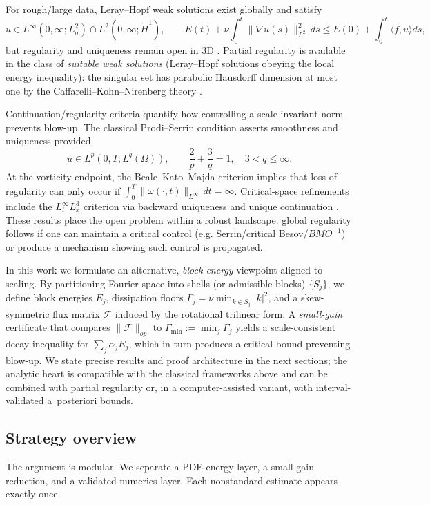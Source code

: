 \IfFileExists{nyjm.cls}{\documentclass[11pt]{nyjm}}{\documentclass[11pt]{amsart}}
\theoremstyle{plain}
\theoremstyle{definition}
\theoremstyle{remark}
\begin{document}
For rough/large data, Leray--Hopf weak solutions exist globally and satisfy
\[
u\in L^\infty(0,\infty;L^2_\sigma)\cap L^2(0,\infty;\dot H^1),\qquad
E(t)+\nu\int_0^t \|\nabla u(s)\|_{L^2}^2\,ds \le E(0) + \int_0^t\!\!\langle f,u\rangle ds,
\]
but regularity and uniqueness remain open in 3D \cite{Leray1934,Hopf1951,Ladyzhenskaya1969,Lions1969}. Partial regularity is available in the class of \emph{suitable weak solutions} (Leray--Hopf solutions obeying the local energy inequality): the singular set has parabolic Hausdorff dimension at most one by the Caffarelli--Kohn--Nirenberg theory \cite{CKN1982}.


Continuation/regularity criteria quantify how controlling a scale-invariant norm prevents blow-up. The classical Prodi--Serrin condition \cite{Prodi1959,Serrin1962} asserts smoothness and uniqueness provided
\[
u\in L^p(0,T;L^q(\Omega)),\qquad \frac{2}{p}+\frac{3}{q}=1,\quad 3<q\le\infty.
\]
At the vorticity endpoint, the Beale--Kato--Majda criterion \cite{BealeKatoMajda1984} implies that loss of regularity can only occur if $\int_0^T \|\omega(\cdot,t)\|_{L^\infty}\,dt=\infty$. Critical-space refinements include the $L^\infty_t L^3_x$ criterion via backward uniqueness and unique continuation \cite{EscauriazaSereginSverak2003}. These results place the open problem within a robust landscape: global regularity follows if one can maintain a critical control (e.g. Serrin/critical Besov/$BMO^{-1}$) or produce a mechanism showing such control is propagated.


In this work we formulate an alternative, \emph{block-energy} viewpoint aligned to scaling. By partitioning Fourier space into shells (or admissible blocks) $\{S_j\}$, we define block energies $E_j$, dissipation floors $\Gamma_j=\nu\min_{k\in S_j}|k|^2$, and a skew-symmetric flux matrix $\mathcal F$ induced by the rotational trilinear form. A \emph{small-gain} certificate that compares $\|\mathcal F\|_{op}$ to $\Gamma_{\min}:=\min_j \Gamma_j$ yields a scale-consistent decay inequality for $\sum_j \alpha_j E_j$, which in turn produces a critical bound preventing blow-up. We state precise results and proof architecture in the next sections; the analytic heart is compatible with the classical frameworks above and can be combined with partial regularity or, in a computer-assisted variant, with interval-validated a~posteriori bounds.

\subsection{Strategy overview}
The argument is modular. We separate a PDE energy layer, a small-gain reduction, and a validated-numerics layer. Each nonstandard estimate appears exactly once.
\end{document}
